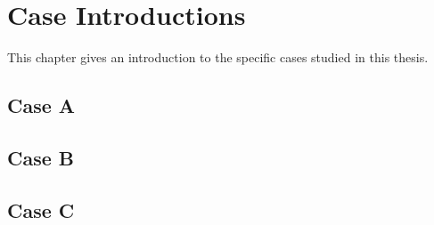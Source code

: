 \chapter{Case Introductions}
\label{chp:CaseIntroductions}
This chapter gives an introduction to the specific cases studied in this thesis.  
\section{Case A}

\section{Case B}

\section{Case C}